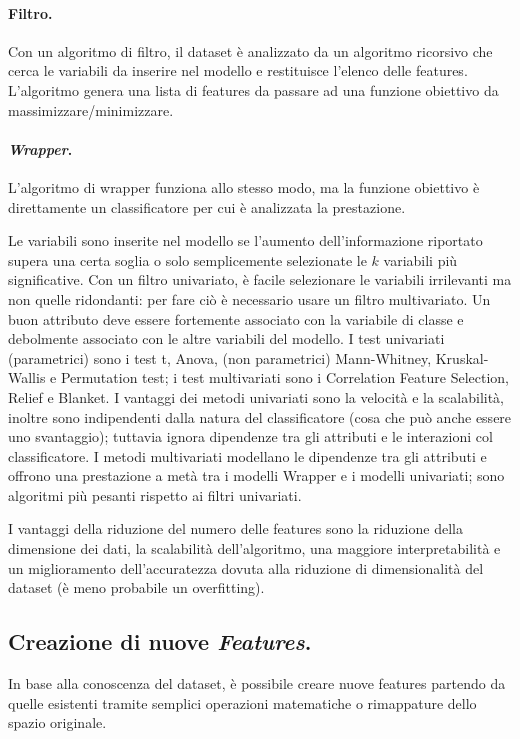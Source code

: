 \documentclass[11pt, a4page, twocolumn]{article}
\begin{document}
\paragraph{Filtro.}
Con un algoritmo di filtro, il dataset è analizzato da un algoritmo ricorsivo che cerca le variabili da inserire nel modello e restituisce l'elenco delle features.
L'algoritmo genera una lista di features da passare ad una funzione obiettivo da massimizzare/minimizzare.

\paragraph{\textit{Wrapper}.}
L'algoritmo di wrapper funziona allo stesso modo, ma la funzione obiettivo è direttamente un classificatore per cui è analizzata la prestazione. \newline

Le variabili sono inserite nel modello se l'aumento dell'informazione riportato supera una certa soglia o solo semplicemente selezionate le $k$ variabili più significative.
Con un filtro univariato, è facile selezionare le variabili irrilevanti ma non quelle ridondanti: per fare ciò è necessario usare un filtro multivariato.
Un buon attributo deve essere fortemente associato con la variabile di classe e debolmente associato con le altre variabili del modello.
I test univariati (parametrici) sono i test t, Anova, (non parametrici) Mann-Whitney, Kruskal-Wallis e Permutation test; i test multivariati sono i Correlation Feature Selection, Relief e Blanket.
I vantaggi dei metodi univariati sono la velocità e la scalabilità, inoltre sono indipendenti dalla natura del classificatore (cosa che può anche essere uno svantaggio); tuttavia ignora dipendenze tra gli attributi e le interazioni col classificatore. \newline
I metodi multivariati modellano le dipendenze tra gli attributi e offrono una prestazione a metà tra i modelli Wrapper e i modelli univariati; sono algoritmi più pesanti rispetto ai filtri univariati.

I vantaggi della riduzione del numero delle features sono la riduzione della dimensione dei dati, la scalabilità dell'algoritmo, una maggiore interpretabilità e un miglioramento dell'accuratezza dovuta alla riduzione di dimensionalità del dataset (è meno probabile un overfitting).

\subsection{Creazione di nuove \textit{Features}.}
In base alla conoscenza del dataset, è possibile creare nuove features partendo da quelle esistenti tramite semplici operazioni matematiche o rimappature dello spazio originale.
\end{document}
